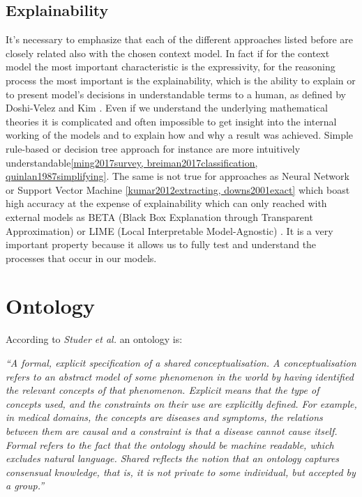 \documentclass{thesisreport}
\begin{document}
\subsection{Explainability}
It's necessary to emphasize that each of the different approaches listed before are closely related also with the chosen context model. In fact if for the context model the most important characteristic is the expressivity, for the reasoning process the most important is the explainability, which is the ability to explain or to present model's decisions in understandable terms to a human, as defined by Doshi-Velez and Kim \cite{doshi2017towards}.
Even if we understand the underlying mathematical theories it is complicated and often impossible to get insight into the internal working of the models and to explain how and why a result was achieved.
Simple rule-based or decision tree approach for instance are more intuitively understandable\ref{ming2017survey, breiman2017classification, quinlan1987simplifying}. The same is not true for approaches as Neural Network or Support Vector Machine \ref{kumar2012extracting, downs2001exact} which boast high accuracy at the expense of explainability which can only reached with external models as BETA (Black Box Explanation through Transparent Approximation) \cite{lakkaraju2017interpretable} or LIME (Local Interpretable Model-Agnostic) \cite{ribeiro2016should}.
It is a very important property because it allows us to fully test and understand the processes that occur in our models.


\section{Ontology} \label{ontology}
According to \textit{Studer et al.} \cite{studer1998knowledge} an ontology is: 
\begin{center}
\textit{``A formal, explicit specification of a shared conceptualisation. A conceptualisation refers to an abstract model of some phenomenon in the world by having identified the relevant concepts of that phenomenon. Explicit means that the type of concepts used, and the constraints on their use are explicitly defined. For example, in medical domains, the concepts are diseases and symptoms, the relations between them are causal and a constraint is that a disease cannot cause itself. Formal refers to the fact that the ontology should be machine readable, which excludes natural language. Shared reflects the notion that an ontology captures consensual knowledge, that is, it is not private to some individual, but accepted by a group.”}
\end{center}
\end{document}
